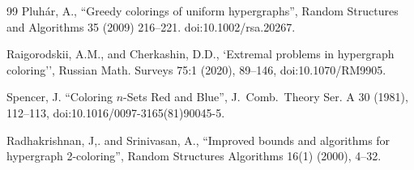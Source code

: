 \documentclass[a4paper,12pt]{article}
\begin{document}
\begin{thebibliography}{99}
 Pluhár, A.,
 ``Greedy colorings of uniform hypergraphs'', 
Random Structures and Algorithms 35 (2009) 216--221. doi:10.1002/rsa.20267.

 Raigorodskii, A.M., and Cherkashin, D.D., `Extremal problems
in hypergraph coloring'', Russian Math. Surveys 75:1 (2020), 89--146,
doi:10.1070/RM9905.

 Spencer, J. ``Coloring $n$-Sets Red and Blue'', J.\ Comb.\ 
Theory Ser. A 30 (1981), 112--113,
doi:10.1016/0097-3165(81)90045-5.

 Radhakrishnan, J,. and Srinivasan, A.,
``Improved bounds and algorithms for hypergraph 2-coloring'', 
Random Structures Algorithms 16(1) (2000), 4--32.

\end{thebibliography}
\end{document}
